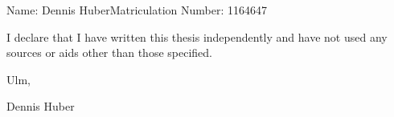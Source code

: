 \documentclass[a4paper,12pt,
headsepline,           %
oneside,               %
numbers=noenddot,      %
bibtotoc,              %
BCOR15mm               %
]{scrbook}
\newcommand{\fullname}{Dennis Huber}
\newcommand{\matnr}{1164647}
\begin{document}

\tableofcontents

\mainmatter









\appendix


\backmatter

\printbibliography

\clearpage
\thispagestyle{empty}

Name: \fullname \hfill Matriculation Number: \matnr \vspace{2cm}


I declare that I have written this thesis independently and have not used any sources or aids other than those specified.\vspace{2cm}

Ulm, \dotfill

\hspace{10cm} {\footnotesize \fullname}
\end{document}
